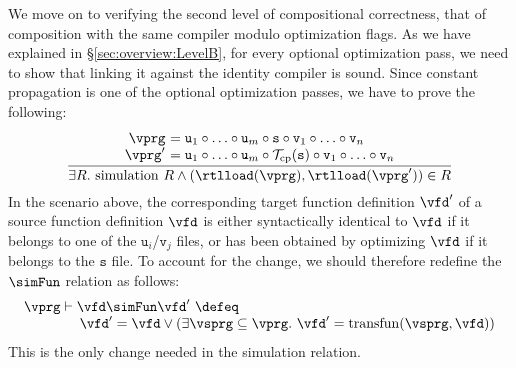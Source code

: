 We move on to verifying the second level of compositional correctness, that of composition with the same compiler modulo optimization flags.
As we have explained in \S\ref{sec:overview:LevelB}, for every optional optimization pass, we need to show that linking it against the identity compiler is sound.
Since constant propagation is one of the optional optimization passes, we have to prove the following:
\[
\frac{
\begin{array}{@{}r@{~}l@{}}
\vprg &= \mathtt{u}_1\circ \ldots \circ \mathtt{u}_m\circ\mathtt{s} \circ \mathtt{v}_1\circ \ldots \circ \mathtt{v}_n\\
\vprg' &= \mathtt{u}_1\circ \ldots \circ \mathtt{u}_m\circ\mathcal{T}_{\rm cp}(\mathtt{s}) \circ \mathtt{v}_1\circ \ldots \circ \mathtt{v}_n
\end{array}
}
{\exists R.~ \mathrm{simulation}~R \land 
(\rtlload(\vprg),\rtlload(\vprg'))\in R
}
\]
In the scenario above, the corresponding target function definition $\vfd'$ of a source function definition $\vfd$
is either syntactically identical to $\vfd$ if it belongs to one of the $\mathtt{u}_i$/$\mathtt{v}_j$ files, 
or has been obtained by optimizing $\vfd$ if it belongs to the $\mathtt{s}$ file.
To account for the change, we should therefore redefine the $\simFun$ relation as follows:
\[ 
\begin{array}{l}
\vprg \vdash \vfd \simFun \vfd' ~\defeq~ 
\\\qquad\qquad
\vfd' = \vfd \lor (\exists \vsprg \subseteq \vprg.~ \vfd' = \mathrm{transfun}(\vsprg,\vfd))
\end{array}
\]
This is the only change needed in the simulation relation.





